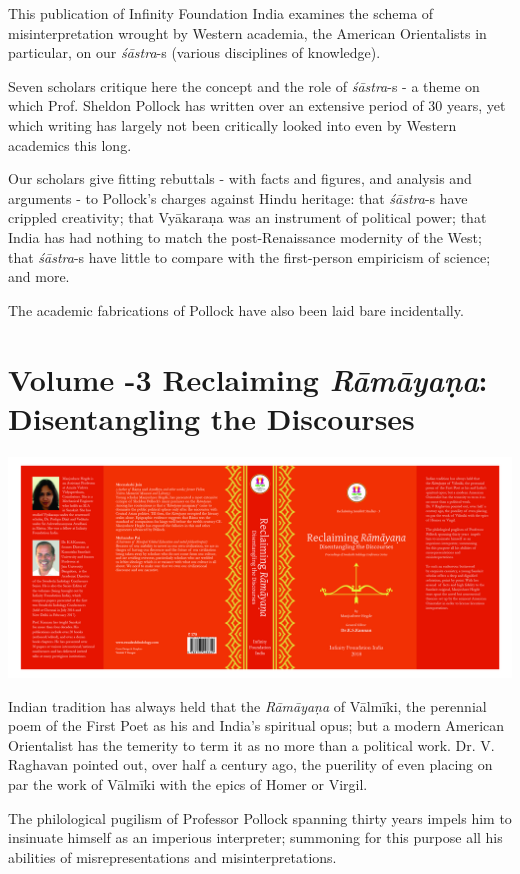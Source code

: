 This publication of Infinity Foundation India examines the schema of misinterpretation wrought by Western academia, the American Orientalists in particular, on our \textit{śāstra}-s (various disciplines of knowledge).

Seven scholars critique here the concept and the role of \textit{śāstra}-s - a theme on which Prof. Sheldon Pollock has written over an extensive period of 30 years, yet which writing has largely not been critically looked into even by Western academics this long.

Our scholars give fitting rebuttals - with facts and figures, and analysis and arguments - to Pollock's charges against Hindu heritage: that \textit{śāstra}-s have crippled creativity; that Vyākaraṇa was an instrument of political power; that India has had nothing to match the post-Renaissance modernity of the West; that \textit{śāstra}-s have little to compare with the first-person empiricism of science; and more.

The academic fabrications of Pollock have also been laid bare incidentally.


\section*{Volume -3 Reclaiming \textit{Rāmāyaṇa}: Disentangling the Discourses}

\includegraphics{images/fig03.png}

Indian tradition has always held that the \textit{Rāmāyaṇa} of Vālmīki, the perennial poem of the First Poet as his and India’s spiritual opus; but a modern American Orientalist has the temerity to term it as no more than a political work. Dr. V. Raghavan pointed out, over half a century ago, the puerility of even placing on par the work of Vālmīki with the epics of Homer or Virgil.

The philological pugilism of Professor Pollock spanning thirty years impels him to insinuate himself as an imperious interpreter; summoning for this purpose all his abilities of misrepresentations and misinterpretations.

